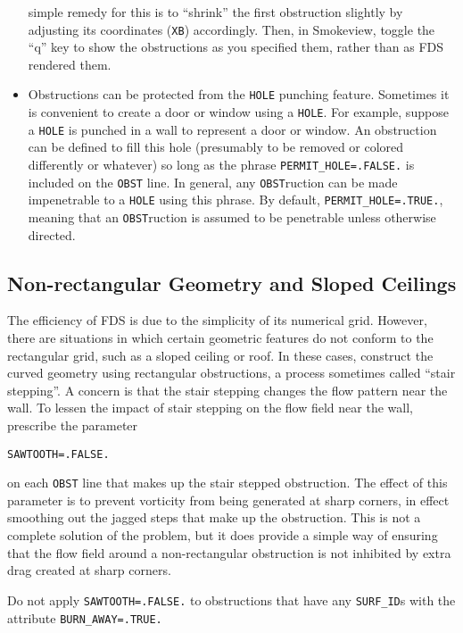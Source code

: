 \documentclass[11pt]{book}
\newcommand{\ct}{\tt\small}
\begin{document}
\begin{itemize}
simple remedy for this is to ``shrink'' the first obstruction slightly by adjusting its coordinates ({\ct XB}) accordingly. Then, in
Smokeview, toggle the ``q'' key to show the obstructions as you specified them, rather than as FDS rendered them.
\item Obstructions can be protected from the {\ct HOLE} punching feature. Sometimes
it is convenient to create a door or window using a {\ct HOLE}. For example, suppose a
{\ct HOLE} is punched in a wall to represent a door or window. An obstruction can be
defined to fill this hole (presumably to be removed or colored differently or whatever) so
long as the phrase {\ct PERMIT\_HOLE=.FALSE.} is included on the {\ct OBST} line. In general,
any {\ct OBST}ruction can be made impenetrable to a {\ct HOLE} using this phrase. By default,
{\ct PERMIT\_HOLE=.TRUE.}, meaning that an {\ct OBST}ruction is assumed to be penetrable unless
otherwise directed.
\end{itemize}

\subsection{Non-rectangular Geometry and Sloped Ceilings}%
The efficiency of FDS is due to the simplicity of its numerical grid.
However, there are situations in which certain geometric features do
not conform to the rectangular grid, such as a sloped ceiling or roof. In these cases,
construct the curved geometry using rectangular obstructions, a process
sometimes called ``stair stepping''. A concern is that
the stair stepping changes the flow pattern near the wall. To lessen
the impact of stair stepping on the flow field near the wall,
prescribe the parameter

\footnotesize
\begin{verbatim}
SAWTOOTH=.FALSE.
\end{verbatim}
\normalsize
on each {\ct OBST} line that makes up the stair stepped obstruction.
The effect of this parameter is to prevent vorticity from being generated
at sharp corners, in effect smoothing out the jagged steps that make up
the obstruction. This is not a complete solution of the problem, but it
does provide a simple way of ensuring that the flow field around a
non-rectangular obstruction is not inhibited by extra drag created at
sharp corners.

\begin{warning}
Do not apply {\ct SAWTOOTH=.FALSE.} to obstructions that have any {\ct SURF\_ID}s with the
attribute {\ct BURN\_AWAY=.TRUE.}
\end{warning}
\end{document}
